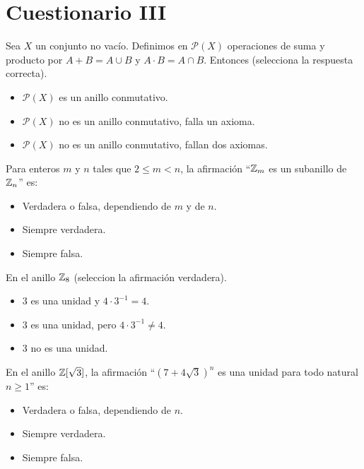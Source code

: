 \section{Cuestionario III}
\begin{ejercicio}
    Sea $X$ un conjunto no vacío. Definimos en $\mathcal{P}(X)$ operaciones de suma y producto por $A+B = A \cup B$ y $A \cdot B = A \cap B$. Entonces (selecciona la respuesta correcta).
    \begin{itemize}
        \item $\mathcal{P}(X)$ es un anillo conmutativo.
        \item $\mathcal{P}(X)$ no es un anillo conmutativo, falla un axioma.
        \item $\mathcal{P}(X)$ no es un anillo conmutativo, fallan dos axiomas.
    \end{itemize}
\end{ejercicio}

\begin{ejercicio}
    Para enteros $m$ y $n$ tales que $2 \leq m < n$, la afirmación ``$\mathbb{Z}_m$ es un subanillo de $\mathbb{Z}_n$'' es:
    \begin{itemize}
        \item Verdadera o falsa, dependiendo de $m$ y de $n$.
        \item Siempre verdadera.
        \item Siempre falsa.
    \end{itemize}
\end{ejercicio}

\begin{ejercicio}
    En el anillo $\mathbb{Z}_8$ (seleccion la afirmación verdadera).
    \begin{itemize}
        \item $3$ es una unidad y $4 \cdot 3^{-1} = 4$.
        \item $3$ es una unidad, pero $4 \cdot 3^{-1} \neq 4$.
        \item $3$ no es una unidad.
    \end{itemize}
\end{ejercicio}

\begin{ejercicio}
    En el anillo $\mathbb{Z}[\sqrt{3}]$, la afirmación ``${(7+4\sqrt{3})}^n$ es una unidad para todo natural $n \geq 1$'' es:
    \begin{itemize}
        \item Verdadera o falsa, dependiendo de $n$.
        \item Siempre verdadera.
        \item Siempre falsa.
    \end{itemize}
\end{ejercicio}

